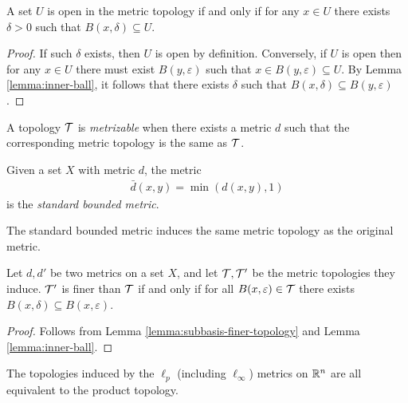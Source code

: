 \begin{lemma}
    A set $U$ is open in the metric topology if and only if for any $x \in U$ there exists $\delta > 0$ such that $B(x, \delta) \subseteq U$.
\end{lemma}

\begin{proof}
    If such $\delta$ exists, then $U$ is open by definition. Conversely, if $U$ is open then for any $x \in U$ there must exist $B(y, \varepsilon)$ such that $x \in B(y, \varepsilon) \subseteq U$. By Lemma \ref{lemma:inner-ball}, it follows that there exists $\delta$ such that $B(x, \delta) \subseteq B(y, \varepsilon)$.
\end{proof}

\begin{defn}
    A topology $\mathcal{T}$ is \emph{metrizable} when there exists a metric $d$ such that the corresponding metric topology is the same as $\mathcal{T}$.
\end{defn}

\begin{defn}
    Given a set $X$ with metric $d$, the metric
    \begin{align*}
        \bar{d}(x, y) = \min(d(x, y), 1)
    \end{align*}
    is the \emph{standard bounded metric}.
\end{defn}

\begin{rmk}
    The standard bounded metric induces the same metric topology as the original metric.
\end{rmk}

\begin{lemma}\label{lemma:finer-metric-topology}
    Let $d, d'$ be two metrics on a set $X$, and let $\mathcal{T}, \mathcal{T}'$ be the metric topologies they induce. $\mathcal{T}'$ is finer than $\mathcal{T}$ if and only if for all $B(x, \varepsilon) \in \mathcal{T}$ there exists $B(x, \delta) \subseteq B(x, \varepsilon)$.
\end{lemma}

\begin{proof}
    Follows from Lemma \ref{lemma:subbasis-finer-topology} and Lemma \ref{lemma:inner-ball}.
\end{proof}

\begin{thm}
    The topologies induced by the $\ell_p$ (including $\ell_{\infty}$) metrics on $\mathbb{R}^n$ are all equivalent to the product topology.
\end{thm}

